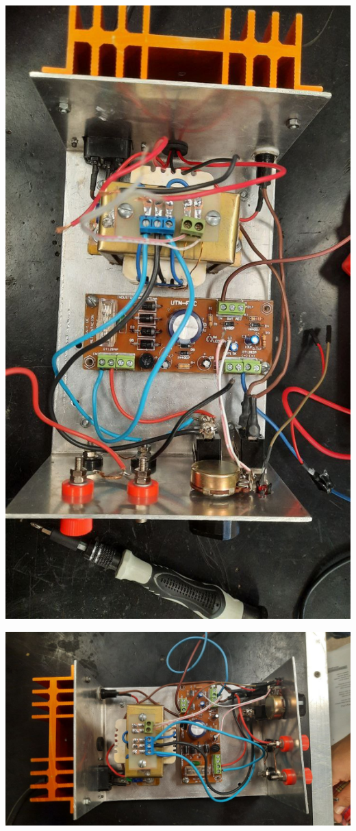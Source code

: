 \begin{center}
    \centering
    \includegraphics[width=0.9\linewidth]{./imagenes/fuente_completa.jpg}
\end{center}

\begin{center}
    \centering
    \includegraphics[width=0.9\linewidth]{./imagenes/fuente_sin_LM317.jpg}
\end{center}

